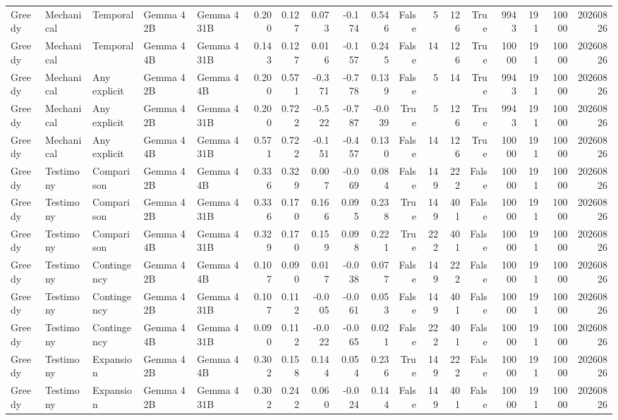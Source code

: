 \begin{tabular}{lllllrrrrrrrrrrrrr}
Greedy & Mechanical & Temporal & Gemma 4 2B & Gemma 4 31B & 0.200 & 0.127 & 0.073 & -0.174 & 0.546 & False & 5 & 126 & True & 9943 & 191 & 10000 & 20260826 \\
Greedy & Mechanical & Temporal & Gemma 4 4B & Gemma 4 31B & 0.143 & 0.127 & 0.016 & -0.157 & 0.245 & False & 14 & 126 & True & 10000 & 191 & 10000 & 20260826 \\
Greedy & Mechanical & Any explicit & Gemma 4 2B & Gemma 4 4B & 0.200 & 0.571 & -0.371 & -0.778 & 0.139 & False & 5 & 14 & True & 9943 & 191 & 10000 & 20260826 \\
Greedy & Mechanical & Any explicit & Gemma 4 2B & Gemma 4 31B & 0.200 & 0.722 & -0.522 & -0.787 & -0.039 & True & 5 & 126 & True & 9943 & 191 & 10000 & 20260826 \\
Greedy & Mechanical & Any explicit & Gemma 4 4B & Gemma 4 31B & 0.571 & 0.722 & -0.151 & -0.457 & 0.130 & False & 14 & 126 & True & 10000 & 191 & 10000 & 20260826 \\
Greedy & Testimony & Comparison & Gemma 4 2B & Gemma 4 4B & 0.336 & 0.329 & 0.007 & -0.069 & 0.084 & False & 149 & 222 & False & 10000 & 191 & 10000 & 20260826 \\
Greedy & Testimony & Comparison & Gemma 4 2B & Gemma 4 31B & 0.336 & 0.170 & 0.166 & 0.095 & 0.238 & True & 149 & 401 & False & 10000 & 191 & 10000 & 20260826 \\
Greedy & Testimony & Comparison & Gemma 4 4B & Gemma 4 31B & 0.329 & 0.170 & 0.159 & 0.098 & 0.221 & True & 222 & 401 & False & 10000 & 191 & 10000 & 20260826 \\
Greedy & Testimony & Contingency & Gemma 4 2B & Gemma 4 4B & 0.107 & 0.090 & 0.017 & -0.038 & 0.077 & False & 149 & 222 & False & 10000 & 191 & 10000 & 20260826 \\
Greedy & Testimony & Contingency & Gemma 4 2B & Gemma 4 31B & 0.107 & 0.112 & -0.005 & -0.061 & 0.053 & False & 149 & 401 & False & 10000 & 191 & 10000 & 20260826 \\
Greedy & Testimony & Contingency & Gemma 4 4B & Gemma 4 31B & 0.090 & 0.112 & -0.022 & -0.065 & 0.021 & False & 222 & 401 & False & 10000 & 191 & 10000 & 20260826 \\
Greedy & Testimony & Expansion & Gemma 4 2B & Gemma 4 4B & 0.302 & 0.158 & 0.144 & 0.054 & 0.236 & True & 149 & 222 & False & 10000 & 191 & 10000 & 20260826 \\
Greedy & Testimony & Expansion & Gemma 4 2B & Gemma 4 31B & 0.302 & 0.242 & 0.060 & -0.024 & 0.144 & False & 149 & 401 & False & 10000 & 191 & 10000 & 20260826 \\

\end{tabular}

